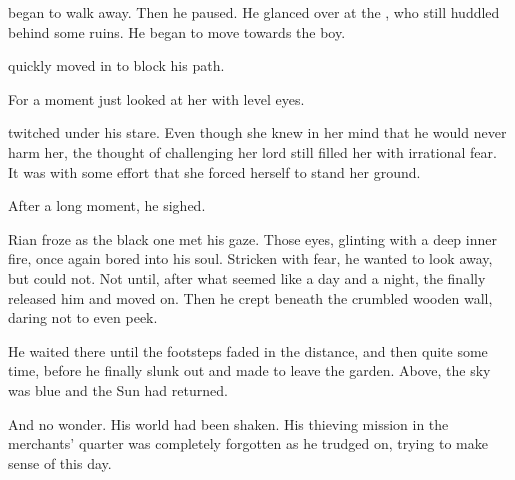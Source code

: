 \Ishnaruchaefir{} began to walk away. 
Then he paused.
He glanced over at the \human, who still huddled behind some ruins. 
He began to move towards the boy. 


\Criseis{} quickly moved in to block his path.

For a moment \Ishnaruchaefir{} just looked at her with level eyes. 

\Criseis{} twitched under his stare. 
Even though she knew in her mind that he would never harm her, the thought of challenging her lord still filled her with irrational fear. 
It was with some effort that she forced herself to stand her ground.

After a long moment, he sighed. 





\begin{comment}
\subsubsection{Rian}
\end{comment}
\new
Rian froze as the black one met his gaze. Those eyes, glinting with a deep inner fire, once again bored into his soul. Stricken with fear, he wanted to look away, but could not. Not until, after what seemed like a day and a night, the \scatha{} finally released him and moved on. Then he crept beneath the crumbled wooden wall, daring not to even peek. 

He waited there until the footsteps faded in the distance, and then quite some time, before he finally slunk out and made to leave the garden. Above, the sky was blue and the Sun had returned. 


And no wonder. His world had been shaken. His thieving mission in the merchants' quarter was completely forgotten as he trudged on, trying to make sense of this day. 

